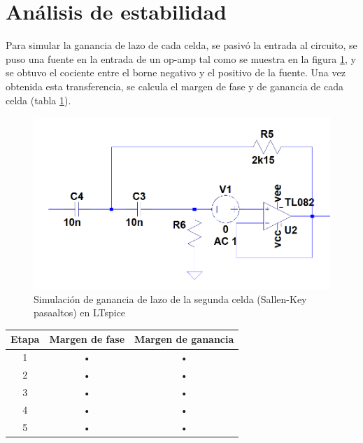 \section{An\'alisis de estabilidad}

Para simular la ganancia de lazo de cada celda, se pasiv\'o la entrada al circuito, se puso una fuente en la entrada de un op-amp tal como se muestra en la figura \ref{fig:loop_gain_sim}, y se obtuvo el cociente entre el borne negativo y el positivo de la fuente. Una vez obtenida esta transferencia, se calcula el margen de fase y de ganancia de cada celda (tabla \ref{tab:margenes_estabilidad}).

\begin{figure}[H]
	\centering
	\includegraphics[scale=0.5]{imagenes/loop_gain_sim}
	\caption{Simulaci\'on de ganancia de lazo de la segunda celda (Sallen-Key pasaaltos) en LTspice}
	\label{fig:loop_gain_sim}
\end{figure}

\begin{table}[H]
	\centering
	\begin{tabular}{||c c c||}
	\hline 
	Etapa & Margen de fase & Margen de ganancia \\ 
	\hline 
	\hline
	1 & • & • \\ 
	
	2 & • & • \\ 
	
	3 & • & • \\ 
	
	4 & • & • \\ 
	
	5 & • & • \\ 
	\hline
	\end{tabular} 
	\label{tab:margenes_estabilidad}
\end{table}


